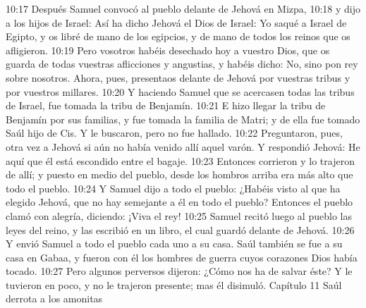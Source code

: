 10:17 Después Samuel convocó al pueblo delante de Jehová en Mizpa,  
10:18 y dijo a los hijos de Israel: Así ha dicho Jehová el Dios de Israel: Yo saqué a Israel de Egipto, y os libré de mano de los egipcios, y de mano de todos los reinos que os afligieron.  
10:19 Pero vosotros habéis desechado hoy a vuestro Dios, que os guarda de todas vuestras aflicciones y angustias, y habéis dicho: No, sino pon rey sobre nosotros. Ahora, pues, presentaos delante de Jehová por vuestras tribus y por vuestros millares.  
10:20 Y haciendo Samuel que se acercasen todas las tribus de Israel, fue tomada la tribu de Benjamín.  
10:21 E hizo llegar la tribu de Benjamín por sus familias, y fue tomada la familia de Matri; y de ella fue tomado Saúl hijo de Cis. Y le buscaron, pero no fue hallado.  
10:22 Preguntaron, pues, otra vez a Jehová si aún no había venido allí aquel varón. Y respondió Jehová: He aquí que él está escondido entre el bagaje.  
10:23 Entonces corrieron y lo trajeron de allí; y puesto en medio del pueblo, desde los hombros arriba era más alto que todo el pueblo.  
10:24 Y Samuel dijo a todo el pueblo: ¿Habéis visto al que ha elegido Jehová, que no hay semejante a él en todo el pueblo? Entonces el pueblo clamó con alegría, diciendo: ¡Viva el rey!  
10:25 Samuel recitó luego al pueblo las leyes del reino, y las escribió en un libro, el cual guardó delante de Jehová.  
10:26 Y envió Samuel a todo el pueblo cada uno a su casa. Saúl también se fue a su casa en Gabaa, y fueron con él los hombres de guerra cuyos corazones Dios había tocado.  
10:27 Pero algunos perversos dijeron: ¿Cómo nos ha de salvar éste? Y le tuvieron en poco, y no le trajeron presente; mas él disimuló.  
Capítulo 11 
Saúl derrota a los amonitas  


